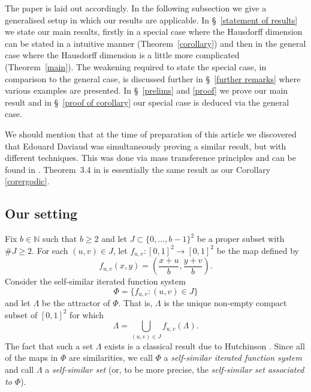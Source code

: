 \documentclass[12pt]{article}
\theoremstyle{remark}
\numberwithin{equation}{section}
\renewcommand{\Bbb}[1]{\mathbb{#1}}
\newcommand{\N}{{\Bbb N}}         %
\newcommand{\0}{\mathbf{0}}
\begin{document}
The paper is laid out accordingly. In the following subsection we give a generalised setup in which our results are applicable. In \S~\ref{statement of results} we state our main results, firstly in a special case where the Hausdorff dimension can be stated in a intuitive manner (Theorem~\ref{corollary}) and then in the general case where the Hausdorff dimension is a little more complicated (Theorem~\ref{main}). The weakening required to state the special case, in comparison to the general case, is discussed further in \S~\ref{further remarks} where various examples are presented. In \S~\ref{prelims} and \ref{proof} we prove our main result and in \S~\ref{proof of corollary} our special case is {deduced} via the general case. \par 
We should mention that at the time of preparation of this article we discovered that Edouard Daviaud was simultaneously proving a similar result, but with different techniques. This was done via mass transference principles and can be found in \cite{Daviaudpreprint}. Theorem~3.4 in \cite{Daviaudpreprint} is essentially the same result as our Corollary \ref{corergodic}.

\subsection{Our setting}

Fix $b \in \N$ such that $b \geq 2$ and let $J \subset \{0, \dots , b-1\}^{2}$ be a proper subset with $\#J \geq 2$. For each $(u,v) \in J$, let $f_{u,v}:[0,1]^2 \to [0,1]^2$ be the map defined by
\begin{equation*}
    f_{u,v}(x,y)=\left(\frac{x+u}{b}, \frac{y+v}{b} \right).
\end{equation*}
Consider the self-similar iterated function system 
\[\Phi=\{f_{u,v} : (u,v) \in J\}\] 
and let $\Lambda$ be the attractor of $\Phi$. That is, $\Lambda$ is the unique non-empty compact subset of $[0,1]^2$ for which
\[\Lambda = \bigcup_{(u,v) \in J}{f_{u,v}(\Lambda)}.\]
The fact that such a set $\Lambda$ exists is a classical result due to Hutchinson \cite{Hutchinson}. Since all of the maps in $\Phi$ are similarities, we call $\Phi$ a \emph{self-similar iterated function system} and call $\Lambda$ a \emph{self-similar set} (or, to be more precise, the \emph{self-similar set associated to $\Phi$}).
\end{document}
